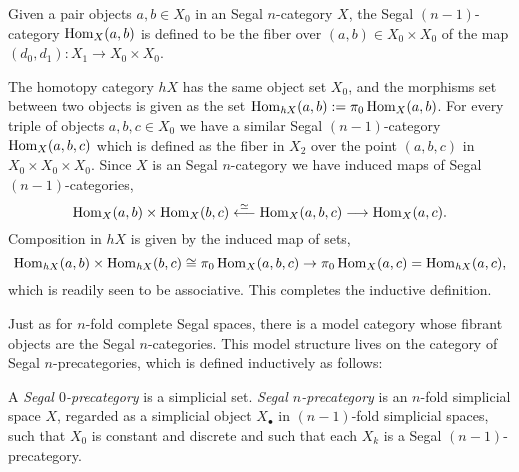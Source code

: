 \documentclass{amsart}
\begin{document}
{Given a pair objects $a,b \in X_0$ in an  Segal $n$-category $X$, the  Segal $(n-1)$-category $\operatorname{Hom}_X(a,b)$ is defined to be the fiber 
over $(a,b) \in X_0 \times X_0$ of the map $(d_0, d_1): X_1 \to X_0 \times X_0$.  
\begin{center}
\end{center}
The homotopy category $\mathit{h}X$ has the same object set $X_0$, and the morphisms set between two objects is given as the set $\operatorname{Hom}_{\mathit{h}X}(a,b) := \pi_0 \operatorname{Hom}_X(a,b)$.  For every triple of objects $a,b,c \in X_0$ we have a similar  Segal $(n-1)$-category $\operatorname{Hom}_X(a,b,c)$ which is defined as the fiber in $X_2$ over the point $(a,b,c)$ in $X_0 \times X_0 \times X_0$. Since $X$ is an  Segal $n$-category we have induced maps of  Segal $(n-1)$-categories,
\begin{equation*}
	\operatorname{Hom}_X(a,b) \times \operatorname{Hom}_X(b,c) \stackrel{\simeq}{\longleftarrow} \operatorname{Hom}_X(a,b,c) \stackrel{}{\longrightarrow} \operatorname{Hom}_X(a,c).
\end{equation*}
Composition in $\mathit{h}X$ is given by the induced map of sets,
\begin{equation*}
	 \operatorname{Hom}_{\mathit{h}X}(a,b) \times \operatorname{Hom}_{\mathit{h}X}(b,c) \cong \pi_0 \operatorname{Hom}_X(a,b,c)\to \pi_0 \operatorname{Hom}_X(a,c) = \operatorname{Hom}_{\mathit{h}X}(a,c),
\end{equation*}
which is readily seen to be associative. This completes the inductive definition.} Just as for $n$-fold complete Segal spaces, there is a model category whose fibrant objects are the Segal $n$-categories. This model structure lives on the category of Segal $n$-precategories, which is defined inductively as follows:

\begin{definition}
	A {\em Segal $0$-precategory} is a simplicial set. {\em Segal $n$-precategory} is an $n$-fold simplicial space $X$, regarded as a simplicial object $X_\bullet$ in $(n-1)$-fold simplicial spaces, such that $X_0$ is constant and discrete and such that each $X_k$ is a  Segal $(n-1)$-precategory. 
\end{definition}
\end{document}
